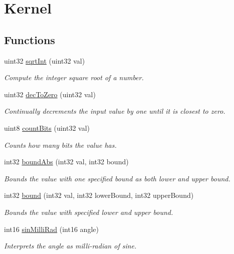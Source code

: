 \hypertarget{group__kernel}{
\section{Kernel}
\label{group__kernel}
}
\subsection*{Functions}
\begin{DoxyCompactItemize}
\item 
uint32 \hyperlink{group__kernel_gaf4aef950d3b64a0efc3cd598e9a6c17d}{sqrtInt} (uint32 val)
\begin{DoxyCompactList}\small\item\em Compute the integer square root of a number. \end{DoxyCompactList}\item 
uint32 \hyperlink{group__kernel_ga7aa1a4f036edc99f7edcff72aef7f31b}{decToZero} (uint32 val)
\begin{DoxyCompactList}\small\item\em Continually decrements the input value by one until it is closest to zero. \end{DoxyCompactList}\item 
uint8 \hyperlink{group__kernel_ga296505f686197250917aa5e4804a1af3}{countBits} (uint32 val)
\begin{DoxyCompactList}\small\item\em Counts how many bits the value has. \end{DoxyCompactList}\item 
int32 \hyperlink{group__kernel_gaf504b0a24c0021553b5c0fa226c1889a}{boundAbs} (int32 val, int32 bound)
\begin{DoxyCompactList}\small\item\em Bounds the value with one specified bound as both lower and upper bound. \end{DoxyCompactList}\item 
int32 \hyperlink{group__kernel_gabb0bf0ea240f580412056369844c3a86}{bound} (int32 val, int32 lowerBound, int32 upperBound)
\begin{DoxyCompactList}\small\item\em Bounds the value with specified lower and upper bound. \end{DoxyCompactList}\item 
int16 \hyperlink{group__kernel_ga9b5d702c682c6b2b84408c42baba8744}{sinMilliRad} (int16 angle)
\begin{DoxyCompactList}\small\item\em Interprets the angle as milli-\/radian of sine. \end{DoxyCompactList}\item 

\end{DoxyCompactItemize}

